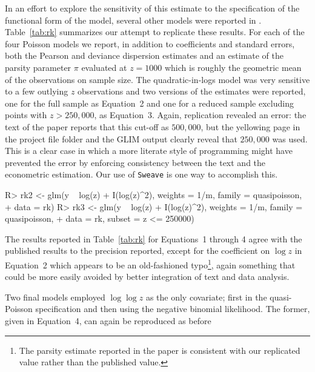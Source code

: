 \documentclass[10pt,a4paper,twoside]{article}
\let\code=\texttt
\let\proglang=\textsf
\newenvironment{Schunk}{}{}
\begin{document}
In an effort to explore the sensitivity of this estimate to the specification of the
functional form of the model, several other models were reported in 
\cite{repro:Koenker:1988}.  Table~\ref{tab:rk} summarizes our attempt to replicate
these results.  For each of the four Poisson models we report, in addition to
coefficients and standard errors, both the Pearson and deviance dispersion estimates
and an estimate of the parsity parameter  $\pi$ evaluated at $z = 1000$ which is
roughly the geometric mean of the observations on sample size.  The quadratic-in-logs
model was very sensitive to a few outlying $z$ observations and two versions of the
estimates were reported, one for the full sample as Equation~2 and one for a reduced
sample excluding points with $z > 250,000$, as Equation~3.  Again, replication 
revealed an error:  the text of the paper  reports that this cut-off  as $500,000$,
but the yellowing page in the project file folder and the \proglang{GLIM}
output clearly reveal that $250,000$ was used.  This is a clear case in which a more
literate style of programming might have prevented the error by enforcing consistency
between the text and the econometric estimation.  Our use of \code{Sweave}  is one
way to accomplish this.

\begin{Schunk}
\begin{Sinput}
R> rk2 <- glm(y ~ log(z) + I(log(z)^2), weights = 1/m, family = quasipoisson,
+    data = rk)
R> rk3 <- glm(y ~ log(z) + I(log(z)^2), weights = 1/m, family = quasipoisson,
+    data = rk, subset = z <= 250000)
\end{Sinput}
\end{Schunk}

The results reported in Table~\ref{tab:rk}  for Equations~1 through 4 agree with the
published results to the precision reported, except for the coefficient on $\log z$
in Equation~2 which appears to be an old-fashioned typo\footnote{The parsity
estimate reported in the paper is consistent with our replicated value rather than
the published value.}, again something that could be more easily avoided by 
better integration of text and data analysis.

Two final models employed $\log \log z$ as the only covariate; 
first in the quasi-Poisson specification and then using the negative binomial
likelihood. The former, given in Equation~4, can again be reproduced as before
\end{document}
